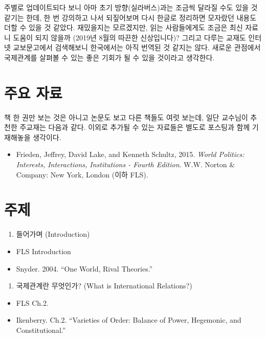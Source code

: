\documentclass[]{book}
\providecommand{\tightlist}{%
  \setlength{\itemsep}{0pt}\setlength{\parskip}{0pt}}
\begin{document}
주별로 업데이트되다 보니 아마 초기 방향(실라버스)과는 조금씩 달라질 수도 있을 것 같기는 한데, 한 번 강의하고 나서 되짚어보며 다시 한글로 정리하면 모자랐던 내용도 더할 수 있을 것 같았다. 재밌을지는 모르겠지만, 읽는 사람들에게도 조금은 최신 자료니 도움이 되지 않을까 (2019년 8월의 따끈한 신상입니다)? 그리고 다루는 교재도 인터넷 교보문고에서 검색해보니 한국에서는 아직 번역된 것 같지는 않다. 새로운 관점에서 국제관계를 살펴볼 수 있는 좋은 기회가 될 수 있을 것이라고 생각한다.

\hypertarget{section}{%
\section{주요 자료}\label{section}}

책 한 권만 보는 것은 아니고 논문도 보고 다른 책들도 여럿 보는데, 일단 교수님이 추천한 주교재는 다음과 같다. 이외로 추가될 수 있는 자료들은 별도로 포스팅과 함께 기재해놓을 생각이다.

\begin{itemize}
\tightlist
\item
  Frieden, Jeffrey, David Lake, and Kenneth Schultz, 2015. \emph{World Politics: Interests, Interactions, Institutions - Fourth Edition}. W.W. Norton \& Company: New York, London (이하 FLS).
\end{itemize}

\hypertarget{section-1}{%
\section{주제}\label{section-1}}

\begin{enumerate}
\def\labelenumi{\arabic{enumi}.}
\tightlist
\item
  들어가며 (Introduction)
\end{enumerate}

\begin{itemize}
\tightlist
\item
  FLS Introduction
\item
  Snyder. 2004. ``One World, Rival Theories.''
\end{itemize}

\begin{enumerate}
\def\labelenumi{\arabic{enumi}.}
\setcounter{enumi}{1}
\tightlist
\item
  국제관계란 무엇인가? (What is International Relations?)
\end{enumerate}

\begin{itemize}
\tightlist
\item
  FLS Ch.2.
\item
  Ikenberry. Ch.2. ``Varieties of Order: Balance of Power, Hegemonic, and Constitutional.''
\end{itemize}
\end{document}
